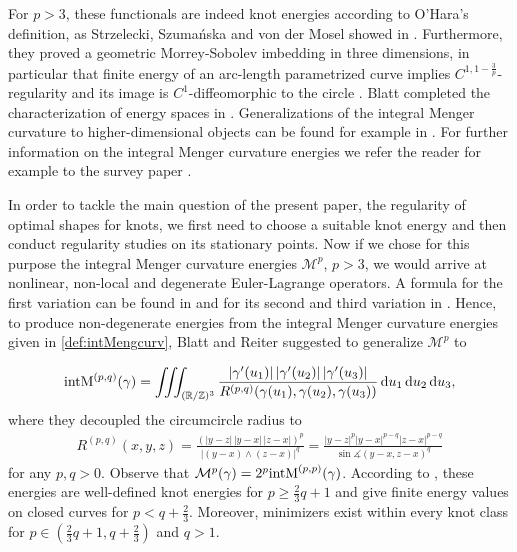 For $p>3$, these functionals are indeed knot energies according to O'Hara's definition, as Strzelecki, Szumańska and von der Mosel showed in \cite{StrzeleckiSzumanskavonderMosel:2013:KnotEnergiesInvolvMengCurv}. Furthermore, they proved a geometric Morrey-Sobolev imbedding in three dimensions, in particular that finite energy of an arc-length parametrized curve implies $C^{1,1-\frac 3p}$-regularity and its image is $C^1$-diffeomorphic to the circle \cite{StrzeleckiSzumanskavonderMosel:2010:RegularizingandselfavoidanceeffectsofintegralMengercurvature}. Blatt completed the characterization of energy spaces in \cite{Blatt:2013:NoteMenger}. Generalizations of the integral Menger curvature to higher-dimensional objects can be found for example in \cite{StrzeleckivonderMosel:2009:IntegralMengercurvatureforsurfaces,BlattKolasinski:2012:SharpboundednessandregularizingeffectsoftheintegralMengercurvatureforsubmanifolds, Kolasinski:2014:GeometricSobolevlikeembeddingusinghighdimensionalMengerlikecurvature}.
For further information on the integral Menger curvature energies  we refer the reader for example to the survey paper \cite{StrzekeckivonderMosel:2013:MengerSurvey}.
 
In order to tackle the main question of the present paper, the regularity of optimal shapes for knots, we first need to choose a suitable knot energy and then conduct regularity studies on its stationary points. 
Now if we chose for this purpose the integral Menger curvature energies $\mathcal{M}^p$, $p>3$, we would arrive at nonlinear, non-local and degenerate Euler-Lagrange operators. A formula for the first variation can be found in \cite{Hermes:2012:Menger} and for its second and third variation in \cite{Knappmann:2020:Menger}. Hence, to produce non-degenerate energies from the integral Menger curvature energies given in \eqref{def:intMengcurv}, Blatt and Reiter \cite{BlattReiter:2015:Menger} suggested to generalize $\mathcal{M}^p$ to

\begin{align}\label{def:GenIntMengCurv}
\textnormal{intM}^{(p,q)}(\gamma) =   \iiint_{(\mathbb{R}/\mathbb{Z})^3} \frac{|\gamma'(u_1)| \, |\gamma'(u_2)| \, |\gamma'(u_3)|}{R^{(p,q)}(\gamma(u_1),\gamma(u_2), \gamma(u_3))} \,\mathrm{d} u_1 \,\mathrm{d} u_2 \,\mathrm{d} u_3, 
\end{align}
where they decoupled the circumcircle radius to
\begin{align*}
R^{(p,q)}(x,y,z) = \frac{(|y-z|\, |y-x| \, |z-x|)^p}{|(y-x)\wedge (z-x)|^q} = \frac{|y-z|^p |y-x|^{p-q} |z-x|^{p-q}}{ \sin \measuredangle (y-x,z-x)^q}
\end{align*} 
for any $p,q>0$. Observe that $\mathcal{M}^{p}(\gamma) = 2^p \textnormal{intM}^{(p,p)}(\gamma) $. According to \cite{BlattReiter:2015:Menger}, these energies are well-defined knot energies for $p\geq \tfrac 23 q + 1$ and give finite energy values on closed curves for $p< q + \tfrac 23$.  Moreover, minimizers exist within every knot class for $p\in (\tfrac 23 q +1,q+\tfrac 23)$ and $q>1$. 

